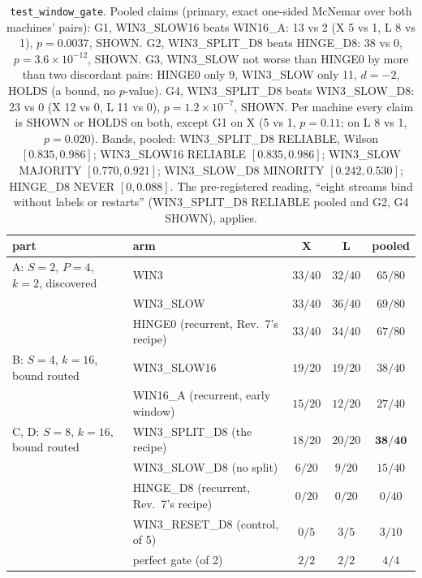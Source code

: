 \documentclass[11pt]{article}
\newcommand{\arm}[1]{\textsf{#1}}
\begin{document}
\begin{table}[h]
\centering
\small
\setlength{\tabcolsep}{5pt}
\begin{tabular}{@{}llccc@{}}
\toprule
part & arm & X & L & pooled\\
\midrule
A: $S{=}2$, $P{=}4$, $k{=}2$, discovered & \arm{WIN3} & $33/40$ & $32/40$ & $65/80$\\
 & \arm{WIN3\_SLOW} & $33/40$ & $36/40$ & $69/80$\\
 & \arm{HINGE0} (recurrent, Rev.~7's recipe) & $33/40$ & $34/40$ & $67/80$\\
\midrule
B: $S{=}4$, $k{=}16$, bound routed & \arm{WIN3\_SLOW16} & $19/20$ & $19/20$ & $38/40$\\
 & \arm{WIN16\_A} (recurrent, early window) & $15/20$ & $12/20$ & $27/40$\\
\midrule
C, D: $S{=}8$, $k{=}16$, bound routed & \arm{WIN3\_SPLIT\_D8} (the recipe) & $18/20$ & $20/20$ & $\mathbf{38/40}$\\
 & \arm{WIN3\_SLOW\_D8} (no split) & $6/20$ & $9/20$ & $15/40$\\
 & \arm{HINGE\_D8} (recurrent, Rev.~7's recipe) & $0/20$ & $0/20$ & $0/40$\\
 & \arm{WIN3\_RESET\_D8} (control, of 5) & $0/5$ & $3/5$ & $3/10$\\
 & perfect gate (of 2) & $2/2$ & $2/2$ & $4/4$\\
\bottomrule
\end{tabular}
\caption{\texttt{test\_window\_gate}. Pooled claims (primary, exact one-sided McNemar over both machines' pairs): G1, \arm{WIN3\_SLOW16} beats \arm{WIN16\_A}: 13 vs 2 (X 5 vs 1, L 8 vs 1), $p = 0.0037$, SHOWN. G2, \arm{WIN3\_SPLIT\_D8} beats \arm{HINGE\_D8}: 38 vs 0, $p = 3.6\times10^{-12}$, SHOWN. G3, \arm{WIN3\_SLOW} not worse than \arm{HINGE0} by more than two discordant pairs: \arm{HINGE0} only 9, \arm{WIN3\_SLOW} only 11, $d = -2$, HOLDS (a bound, no $p$-value). G4, \arm{WIN3\_SPLIT\_D8} beats \arm{WIN3\_SLOW\_D8}: 23 vs 0 (X 12 vs 0, L 11 vs 0), $p = 1.2\times10^{-7}$, SHOWN. Per machine every claim is SHOWN or HOLDS on both, except G1 on X (5 vs 1, $p = 0.11$; on L 8 vs 1, $p = 0.020$). Bands, pooled: \arm{WIN3\_SPLIT\_D8} RELIABLE, Wilson $[0.835, 0.986]$; \arm{WIN3\_SLOW16} RELIABLE $[0.835, 0.986]$; \arm{WIN3\_SLOW} MAJORITY $[0.770, 0.921]$; \arm{WIN3\_SLOW\_D8} MINORITY $[0.242, 0.530]$; \arm{HINGE\_D8} NEVER $[0, 0.088]$. The pre-registered reading, ``eight streams bind without labels or restarts'' (\arm{WIN3\_SPLIT\_D8} RELIABLE pooled and G2, G4 SHOWN), applies.}
\label{tab:main}
\end{table}
\end{document}
